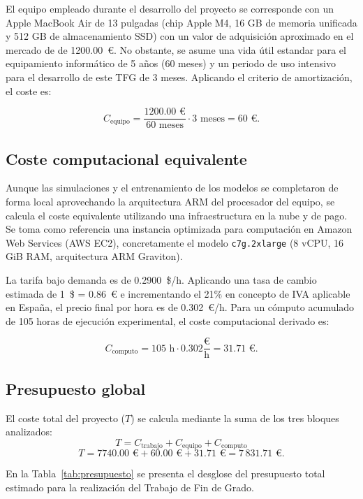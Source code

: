 El equipo empleado durante el desarrollo del proyecto se corresponde con un Apple MacBook Air de 13 pulgadas (chip Apple M4, 16 GB de memoria unificada y 512 GB de almacenamiento SSD) con un valor de adquisición aproximado en el mercado de de 1200.00~€. No obstante, se asume una vida útil estandar para el equipamiento informático de 5 años (60 meses) y un periodo de uso intensivo para el desarrollo de este TFG de 3 meses. Aplicando el criterio de amortización, el coste es:

\[
    C_{\text{equipo}} = \frac{1200.00 \text{ €}}{60 \text{ meses}} \cdot 3 \text{ meses} = 60 \text{ €}.
\]

\subsection{Coste computacional equivalente}

Aunque las simulaciones y el entrenamiento de los modelos se completaron de forma local aprovechando la arquitectura ARM del procesador del equipo, se calcula el coste equivalente utilizando una infraestructura en la nube y de pago. Se toma como referencia una instancia optimizada para computación en Amazon Web Services (AWS EC2), concretamente el modelo \texttt{c7g.2xlarge} (8 vCPU, 16 GiB RAM, arquitectura ARM Graviton).

La tarifa bajo demanda es de 0.2900~\$/h. Aplicando una tasa de cambio estimada de 1~\$ = 0.86~€ e incrementando el 21\% en concepto de IVA aplicable en España, el precio final por hora es de 0.302~€/h. Para un cómputo acumulado de 105 horas de ejecución experimental, el coste computacional derivado es:

\[
    C_{\text{computo}} = 105 \text{ h} \cdot 0.302 \frac{\text{€}}{\text{h}} = 31.71 \text{ €}.
\]

\subsection{Presupuesto global}

El coste total del proyecto ($T$) se calcula mediante la suma de los tres bloques analizados:
\[
    T = C_{\text{trabajo}} + C_{\text{equipo}} + C_{\text{computo}}
\]
\[
    T = 7740.00 \text{ €} + 60.00 \text{ €} + 31.71 \text{ €} = 7\,831.71 \text{ €}.
\]

En la Tabla~\ref{tab:presupuesto} se presenta el desglose del presupuesto total estimado para la realización del Trabajo de Fin de Grado.

